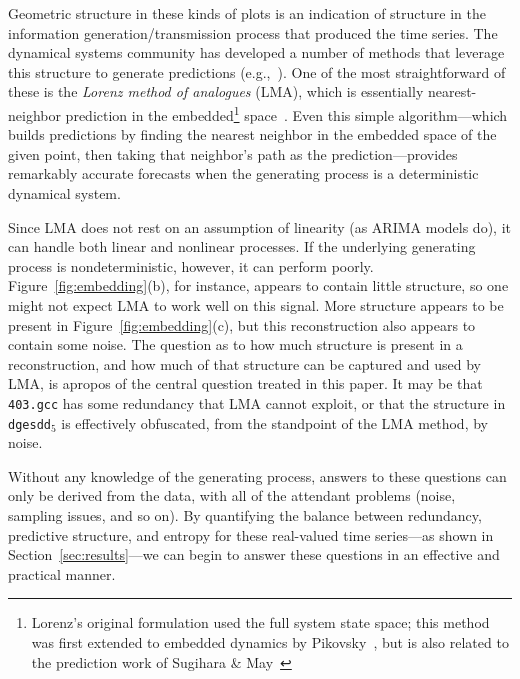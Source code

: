 \documentclass[%
pre,
reprint,
superscriptaddress,
showpacs,
nofootinbib,
nobibnotes,
 amsmath,amssymb,
 aps,
]{revtex4-1}
\newcommand{\gcc}{{\tt 403.gcc}\xspace}
\newcommand{\svdfive}{{\tt dgesdd$_5$}\xspace}
\begin{document}
Geometric structure in these kinds of plots is an indication of
structure in the information generation/transmission process that
produced the time series.  The dynamical systems community has
developed a number of methods that leverage this structure to generate
predictions (e.g.,~\cite{weigend-book,casdagli-eubank92,Smith199250}).
One of the most straightforward of these is the \emph{Lorenz method of
  analogues} (LMA), which is essentially nearest-neighbor prediction
in the embedded\footnote{Lorenz's original formulation used the full
  system state space;
%
%
this method was first extended to embedded dynamics by
Pikovsky~\cite{pikovsky86-sov}, but is also related to the prediction
work of Sugihara \& May~\cite{sugihara90}}
space~\cite{lorenz-analogues}.  Even this simple algorithm---which
builds predictions by finding the nearest neighbor in the embedded
space of the given point, then taking that neighbor's path as the
prediction---provides remarkably accurate forecasts when the
generating process is a deterministic dynamical system.

Since LMA does not rest on an assumption of linearity (as ARIMA models
do), it can handle both linear and nonlinear processes.  If the
underlying generating process is nondeterministic, however, it can
perform poorly.  Figure~\ref{fig:embedding}(b), for instance, appears
to contain little structure, so one might not expect LMA to work well
on this signal.  More structure appears to be present in
Figure~\ref{fig:embedding}(c), but this reconstruction also appears to
contain some noise.  The question as to how much structure is present
in a reconstruction, and how much of that structure can be captured
and used by LMA, is apropos of the central question treated in this
paper.  It may be that \gcc has some redundancy that LMA cannot
exploit, or that the structure in \svdfive is effectively obfuscated,
from the standpoint of the LMA method, by noise.  

Without any knowledge of the generating process, answers to these
questions can only be derived from the data, with all of the attendant
problems (noise, sampling issues, and so on).  By quantifying the
balance between redundancy, predictive structure, and entropy for
these real-valued time series---as shown in
Section~\ref{sec:results}---we can begin to answer these questions in
an effective and practical manner.

\end{document}
